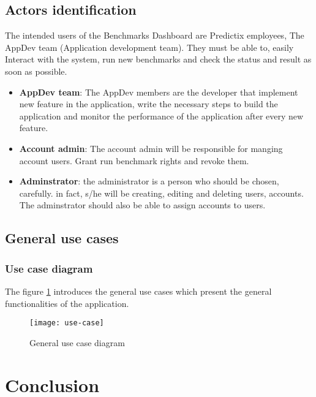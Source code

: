\subsection{Actors identification}
The intended users of the Benchmarks Dashboard are Predictix employees, The
AppDev team (Application development team). They must be able to, easily
Interact with the system, run new benchmarks and check the status and result as
soon as possible.

\begin{itemize}
  \item{\textbf{AppDev team}}: The AppDev members are the developer that implement new
    feature in the application, write the necessary steps to build the
    application and monitor the performance of the application after every new
    feature.
  \item{\textbf{Account admin}}: The account admin will be responsible for manging
    account users. Grant run benchmark rights and revoke them.
  \item{\textbf{Adminstrator}}: the administrator is a person who should be chosen,
    carefully. in fact, s/he will be creating, editing and deleting users,
    accounts. The adminstrator should also be able to assign accounts to users.
\end{itemize}

\subsection{General use cases}
\subsubsection{Use case diagram}
The figure \hyperref[fig:use-case]{\ref{fig:use-case}} introduces the general use cases which present the general
functionalities of the application.

\begin{figure}[h]
  \center
  \texttt{[image: use-case]}
  \caption{General use case diagram}
\label{fig:use-case}
\end{figure}


\section*{Conclusion}
